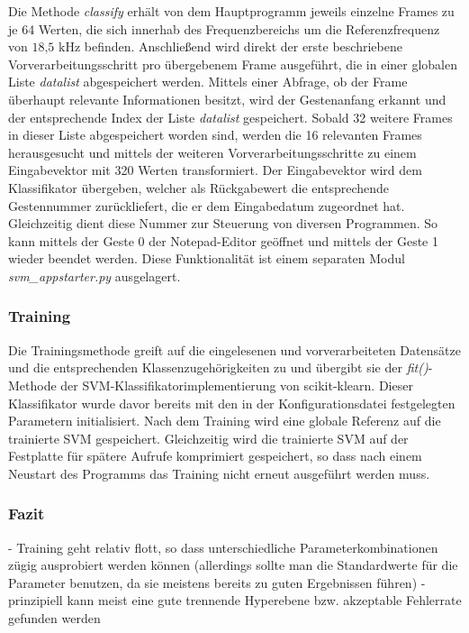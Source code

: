 Die Methode \textit{classify} erhält von dem Hauptprogramm jeweils einzelne Frames zu je 64 Werten, die sich innerhab des Frequenzbereichs um die Referenzfrequenz von $18\text{,}5\text{ kHz}$ befinden.
Anschließend wird direkt der erste beschriebene Vorverarbeitungsschritt pro übergebenem Frame ausgeführt, die in einer globalen Liste \textit{datalist} abgespeichert werden.
Mittels einer Abfrage, ob der Frame überhaupt relevante Informationen besitzt, wird der Gestenanfang erkannt und der entsprechende Index der Liste \textit{datalist} gespeichert.
Sobald 32 weitere Frames in dieser Liste abgespeichert worden sind, werden die 16 relevanten Frames herausgesucht und mittels der weiteren Vorverarbeitungsschritte zu einem Eingabevektor mit 320 Werten transformiert.
Der Eingabevektor wird dem Klassifikator übergeben, welcher als Rückgabewert die entsprechende Gestennummer zurückliefert, die er dem Eingabedatum zugeordnet hat.
Gleichzeitig dient diese Nummer zur Steuerung von diversen Programmen.
So kann mittels der Geste 0 der Notepad-Editor geöffnet und mittels der Geste 1 wieder beendet werden.
Diese Funktionalität ist einem separaten Modul \textit{svm\_appstarter.py} ausgelagert.




\subsubsection{Training}
Die Trainingsmethode greift auf die eingelesenen und vorverarbeiteten Datensätze und die entsprechenden Klassenzugehörigkeiten zu und übergibt sie der \textit{fit()}-Methode der \ac{SVM}-Klassifikatorimplementierung von scikit-klearn.
Dieser Klassifikator wurde davor bereits mit den in der Konfigurationsdatei festgelegten Parametern initialisiert.
Nach dem Training wird eine globale Referenz auf die trainierte \ac{SVM} gespeichert.
Gleichzeitig wird die trainierte \ac{SVM} auf der Festplatte für spätere Aufrufe komprimiert gespeichert, so dass nach einem Neustart des Programms das Training nicht erneut ausgeführt werden muss.



\subsubsection{Fazit}
- Training geht relativ flott, so dass unterschiedliche Parameterkombinationen zügig ausprobiert werden können (allerdings sollte man die Standardwerte für die Parameter benutzen, da sie meistens bereits zu guten Ergebnissen führen)
- prinzipiell kann meist eine gute trennende Hyperebene bzw. akzeptable Fehlerrate gefunden werden

